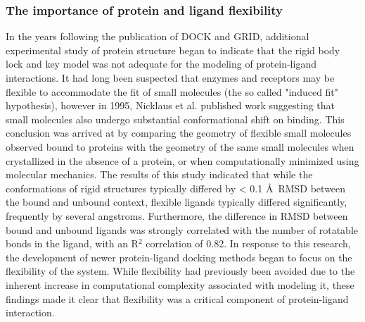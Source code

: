 \subsubsection{The importance of protein and ligand flexibility}
In the years following the publication of DOCK and GRID, additional experimental study of protein structure began to indicate that the rigid body lock and key model was not adequate for the modeling of protein-ligand interactions.
It had long been suspected \citep{KOSHLAND:1958wa} that enzymes and receptors may be flexible to accommodate the fit of small molecules (the so called "induced fit" hypothesis), however in 1995, Nicklaus et al. \citep{Nicklaus:1995tu} published work suggesting that small molecules also undergo substantial conformational shift on binding.
This conclusion was arrived at by comparing the geometry of flexible small molecules observed bound to proteins with the geometry of the same small molecules when crystallized in the absence of a protein, or when computationally minimized using molecular mechanics.
The results of this study indicated that while the conformations of rigid structures typically differed by < 0.1 \AA\ \ac{RMSD} between the bound and unbound context, flexible ligands typically differed significantly, frequently by several angstroms.
Furthermore, the difference in \ac{RMSD} between bound and unbound ligands was strongly correlated with the number of rotatable bonds in the ligand, with an R$^{2}$ correlation of 0.82.
In response to this research, the development of newer protein-ligand docking methods began to focus on the flexibility of the system.
While flexibility had previously been avoided due to the inherent increase in computational complexity associated with modeling it, these findings made it clear that flexibility was a critical component of protein-ligand interaction.

